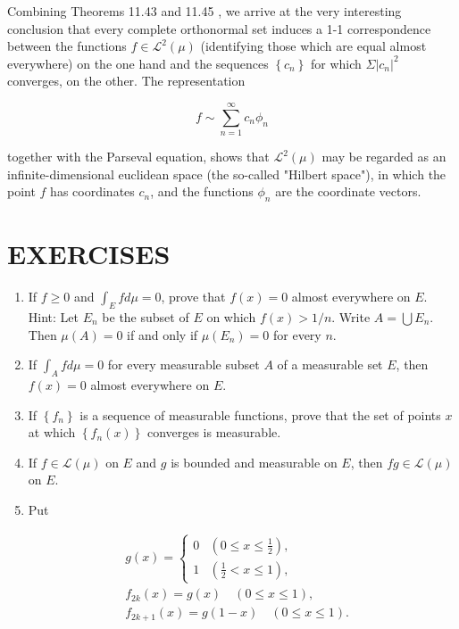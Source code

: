 \documentclass[10pt]{article}
\begin{document}
Combining Theorems 11.43 and 11.45 , we arrive at the very interesting conclusion that every complete orthonormal set induces a 1-1 correspondence between the functions $f \in \mathscr{L}^{2}(\mu)$ (identifying those which are equal almost everywhere) on the one hand and the sequences $\left\{c_{n}\right\}$ for which $\Sigma\left|c_{n}\right|^{2}$ converges, on the other. The representation

$$
f \sim \sum_{n=1}^{\infty} c_{n} \phi_{n}
$$

together with the Parseval equation, shows that $\mathscr{L}^{2}(\mu)$ may be regarded as an infinite-dimensional euclidean space (the so-called "Hilbert space"), in which the point $f$ has coordinates $c_{n}$, and the functions $\phi_{n}$ are the coordinate vectors.

\section{EXERCISES}
\begin{enumerate}
  \item If $f \geq 0$ and $\int_{E} f d \mu=0$, prove that $f(x)=0$ almost everywhere on $E$. Hint: Let $E_{n}$ be the subset of $E$ on which $f(x)>1 / n$. Write $A=\bigcup E_{n}$. Then $\mu(A)=0$ if and only if $\mu\left(E_{n}\right)=0$ for every $n$.

  \item If $\int_{A} f d \mu=0$ for every measurable subset $A$ of a measurable set $E$, then $f(x)=0$ almost everywhere on $E$.

  \item If $\left\{f_{n}\right\}$ is a sequence of measurable functions, prove that the set of points $x$ at which $\left\{f_{n}(x)\right\}$ converges is measurable.

  \item If $f \in \mathscr{L}(\mu)$ on $E$ and $g$ is bounded and measurable on $E$, then $f g \in \mathscr{L}(\mu)$ on $E$.

  \item Put

\end{enumerate}

$$
\begin{aligned}
& g(x)= \begin{cases}0 & \left(0 \leq x \leq \frac{1}{2}\right), \\
1 & \left(\frac{1}{2}<x \leq 1\right),\end{cases} \\
& f_{2 k}(x)=g(x) \quad(0 \leq x \leq 1), \\
& f_{2 k+1}(x)=g(1-x) \quad(0 \leq x \leq 1) .
\end{aligned}
$$
\end{document}
